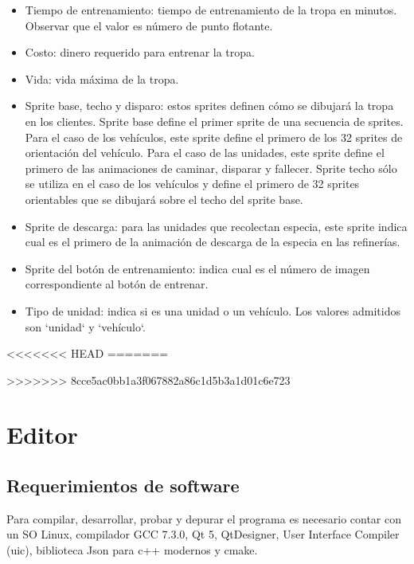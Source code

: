 \documentclass[titlepage,a4paper,12pt]{article}
\begin{document}
\begin{itemize}
\begin{itemize}
\item Tiempo de entrenamiento: tiempo de entrenamiento de la tropa en minutos. Observar que el valor es número de punto flotante.

\item Costo: dinero requerido para entrenar la tropa.

\item Vida: vida máxima de la tropa.

\item Sprite base, techo y disparo: estos sprites definen cómo se dibujará la tropa en los clientes.  Sprite base define el primer sprite de una secuencia de sprites. Para el caso de los vehículos, este sprite define el primero de los 32 sprites de orientación del vehículo. Para el caso de las unidades, este sprite define el primero de las animaciones de caminar, disparar y fallecer.  Sprite techo sólo se utiliza en el caso de los vehículos y define el primero de 32 sprites orientables que se dibujará sobre el techo del sprite base.

\item Sprite de descarga: para las unidades que recolectan especia, este sprite indica cual es el primero de la animación de descarga de la especia en las refinerías.

\item Sprite del botón de entrenamiento: indica cual es el número de imagen correspondiente al botón de entrenar.

\item Tipo de unidad: indica si es una unidad o un vehículo. Los valores admitidos son `unidad` y `vehículo`.

\end{itemize}

\end{itemize}

<<<<<<< HEAD
=======

>>>>>>> 8cce5ac0bb1a3f067882a86c1d5b3a1d01c6e723
\newpage
\section{Editor}

\subsection{Requerimientos de software}
Para compilar, desarrollar, probar y depurar el programa es necesario contar con un SO Linux, compilador GCC 7.3.0, Qt 5, QtDesigner, User Interface Compiler (uic), biblioteca Json para c++ modernos y cmake.
\end{document}
